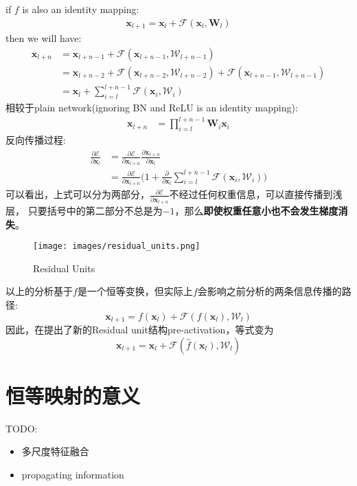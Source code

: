 if $f$ is also an identity mapping:
\begin{equation}
    \begin{split}
        \mathbf{x}_{l+1} = \mathbf{x}_l + \mathcal{F}(\mathbf{x}_l, \mathbf{W}_l)
    \end{split}
\end{equation}
then we will have:
\begin{equation}
    \begin{split}
        \mathbf{x}_{l+n} &= \mathbf{x}_{l + n - 1} + \mathcal{F}(\mathbf{x}_{l + n -1}, \mathcal{W}_{l + n -1}) \\
        &= \mathbf{x}_{l + n - 2} + \mathcal{F}(\mathbf{x}_{l + n - 2}, \mathcal{W}_{l + n - 2}) + \mathcal{F}(\mathbf{x}_{l + n -1}, \mathcal{W}_{l + n -1})\\
        &= \mathbf{x}_l + \sum_{i=l}^{l+n-1} \mathcal{F}(\mathbf{x}_i, \mathcal{W}_i)
    \end{split}
\end{equation}
相较于plain network(ignoring BN and ReLU is an identity mapping):
\begin{equation}
    \begin{split}
        \mathbf{x}_{l+n} &= \prod_{i=l}^{l+n-1} \mathbf{W}_i \mathbf{x}_i
    \end{split}
\end{equation}
反向传播过程:
\begin{equation}
    \begin{split}
        \frac{\partial \mathcal{E}}{\partial \mathbf{x}_l}
        &= \frac{\partial \mathcal{E}}{\partial \mathbf{x}_{l+n}} \frac{\partial \mathbf{x}_{l+n}}{\partial \mathbf{x}_l} \\
        &= \frac{\partial \mathcal{E}}{\partial \mathbf{x}_{l+n}} \Bigg (1 + \frac{\partial}{\partial \mathbf{x}_{l}}\sum_{i=l}^{l+n-1} \mathcal{F}(\mathbf{x}_i, \mathcal{W}_i)\Bigg)
    \end{split}
\end{equation}
可以看出，上式可以分为两部分，$\frac{\partial \mathcal{E}}{\partial \mathbf{x}_{l+n}}$不经过任何权重信息，可以直接传播到浅层，
只要括号中的第二部分不总是为$-1$，那么\textbf{即使权重任意小也不会发生梯度消失}。

\begin{figure}[H]
    \centering
    \texttt{[image: images/residual\_units.png]}
    \caption{Residual Units}
    \label{fig:residual_units}
\end{figure}

以上的分析基于$f$是一个恒等变换，但实际上$f$会影响之前分析的两条信息传播的路径:
\begin{equation}
    \mathbf{x}_{l+1} = f(\mathbf{x}_l) + \mathcal{F}(f(\mathbf{x}_l), \mathcal{W}_l)
\end{equation}
因此，在\cite{He2016identity}提出了新的Residual unit结构pre-activation，等式变为
\begin{equation}
    \mathbf{x}_{l+1} = \mathbf{x}_l + \mathcal{F}(\hat f(\mathbf{x}_l), \mathcal{W}_l)
\end{equation}


\section{恒等映射的意义}
TODO:
\begin{itemize}
    \item 多尺度特征融合
    \item propagating information
\end{itemize}